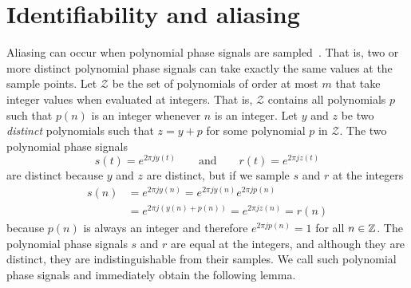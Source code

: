 \documentclass[journal]{IEEEtran}
\begin{document}
\section{Identifiability and aliasing}\label{sec:ident_aliasing}

Aliasing can occur when polynomial phase signals are sampled~\cite{McKilliam2009IndentifiabliltyAliasingPolyphase}.  That is, two or more distinct polynomial phase signals can take exactly the same values at the sample points.  %
Let $\mathcal{Z}$ be the set of polynomials of order at most $m$ that take integer values when evaluated at integers. That is, $\mathcal{Z}$ contains all polynomials $p$ such that $p(n)$ is an integer whenever $n$ is an integer.
Let $y$ and $z$ be two \emph{distinct} polynomials such that $z = y + p$ for some polynomial $p$ in $\mathcal{Z}$. The two polynomial phase signals
\[
s(t) = e^{2\pi j y(t)} \qquad \text{and} \qquad r(t) = e^{2\pi j z(t)}
\]
are distinct because $y$ and $z$ are distinct, but if we sample $s$ and $r$ at the integers  
\begin{align*}
s(n) &= e^{2\pi j y(n)} =  e^{2\pi j y(n)} e^{2\pi j p(n)} \\
&= e^{2\pi j (y(n) + p(n))} = e^{2\pi j z(n)} = r(n)
\end{align*}
because $p(n)$ is always an integer and therefore $e^{2\pi j p(n)} = 1$ for all $n \in {\mathbb Z}$. The polynomial phase signals $s$ and $r$ are equal at the integers, and although they are distinct, they are indistinguishable from their samples. We call such polynomial phase signals  and immediately obtain the following lemma.
\end{document}
